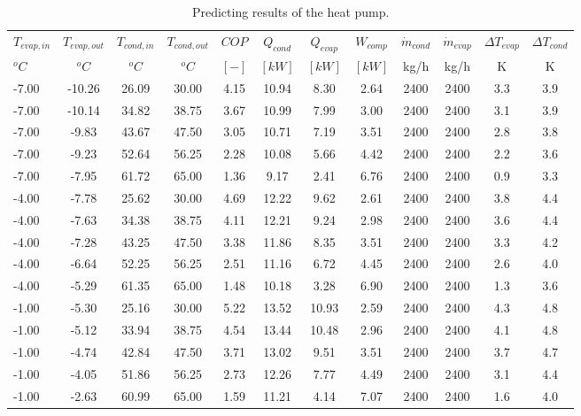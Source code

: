 \documentclass[english]{SPFShortReport}
\begin{document}
\begin{table}[!ht]
\begin{small}
\caption{Predicting results of the heat pump.}
\begin{center}
\resizebox{12cm}{!} 
{
\begin{tabular}{l | c c c c c c c c c c c } 
\hline
\hline
$T_{evap,in}$ &$T_{evap,out}$ &$T_{cond,in}$ &$T_{cond,out}$ &$COP$ &$Q_{cond}$ &$Q_{evap}$ &$W_{comp}$ &$\dot m_{cond}$ &$\dot m_{evap}$ &$\Delta T_{evap}$ &$\Delta T_{cond}$ \\ 
$^oC$ &$^oC$ &$^oC$ &$^oC$ &$[-]$ &$[kW]$ &$[kW]$ &$[kW]$ &kg/h &kg/h &K &K\\ 
\hline
-7.00 & -10.26 & 26.09 & 30.00 & 4.15 & 10.94 & 8.30 & 2.64 & 2400 & 2400 & 3.3 & 3.9\\ 
-7.00 & -10.14 & 34.82 & 38.75 & 3.67 & 10.99 & 7.99 & 3.00 & 2400 & 2400 & 3.1 & 3.9\\ 
-7.00 & -9.83 & 43.67 & 47.50 & 3.05 & 10.71 & 7.19 & 3.51 & 2400 & 2400 & 2.8 & 3.8\\ 
-7.00 & -9.23 & 52.64 & 56.25 & 2.28 & 10.08 & 5.66 & 4.42 & 2400 & 2400 & 2.2 & 3.6\\ 
-7.00 & -7.95 & 61.72 & 65.00 & 1.36 & 9.17 & 2.41 & 6.76 & 2400 & 2400 & 0.9 & 3.3\\ 
-4.00 & -7.78 & 25.62 & 30.00 & 4.69 & 12.22 & 9.62 & 2.61 & 2400 & 2400 & 3.8 & 4.4\\ 
-4.00 & -7.63 & 34.38 & 38.75 & 4.11 & 12.21 & 9.24 & 2.98 & 2400 & 2400 & 3.6 & 4.4\\ 
-4.00 & -7.28 & 43.25 & 47.50 & 3.38 & 11.86 & 8.35 & 3.51 & 2400 & 2400 & 3.3 & 4.2\\ 
-4.00 & -6.64 & 52.25 & 56.25 & 2.51 & 11.16 & 6.72 & 4.45 & 2400 & 2400 & 2.6 & 4.0\\ 
-4.00 & -5.29 & 61.35 & 65.00 & 1.48 & 10.18 & 3.28 & 6.90 & 2400 & 2400 & 1.3 & 3.6\\ 
-1.00 & -5.30 & 25.16 & 30.00 & 5.22 & 13.52 & 10.93 & 2.59 & 2400 & 2400 & 4.3 & 4.8\\ 
-1.00 & -5.12 & 33.94 & 38.75 & 4.54 & 13.44 & 10.48 & 2.96 & 2400 & 2400 & 4.1 & 4.8\\ 
-1.00 & -4.74 & 42.84 & 47.50 & 3.71 & 13.02 & 9.51 & 3.51 & 2400 & 2400 & 3.7 & 4.7\\ 
-1.00 & -4.05 & 51.86 & 56.25 & 2.73 & 12.26 & 7.77 & 4.49 & 2400 & 2400 & 3.1 & 4.4\\ 
-1.00 & -2.63 & 60.99 & 65.00 & 1.59 & 11.21 & 4.14 & 7.07 & 2400 & 2400 & 1.6 & 4.0\\ 

\end{tabular}}
\end{center}
\end{small}
\end{table}
\end{document}

